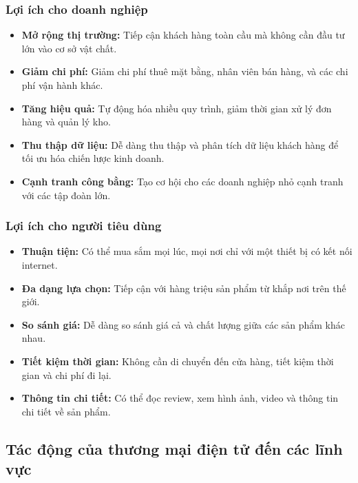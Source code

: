 \documentclass[a4paper,12pt]{report}
\begin{document}
\subsubsection{Lợi ích cho doanh nghiệp}
\begin{itemize}
    \item \textbf{Mở rộng thị trường:} Tiếp cận khách hàng toàn cầu mà không cần đầu tư lớn vào cơ sở vật chất.
    
    \item \textbf{Giảm chi phí:} Giảm chi phí thuê mặt bằng, nhân viên bán hàng, và các chi phí vận hành khác.
    
    \item \textbf{Tăng hiệu quả:} Tự động hóa nhiều quy trình, giảm thời gian xử lý đơn hàng và quản lý kho.
    
    \item \textbf{Thu thập dữ liệu:} Dễ dàng thu thập và phân tích dữ liệu khách hàng để tối ưu hóa chiến lược kinh doanh.
    
    \item \textbf{Cạnh tranh công bằng:} Tạo cơ hội cho các doanh nghiệp nhỏ cạnh tranh với các tập đoàn lớn.
\end{itemize}

\subsubsection{Lợi ích cho người tiêu dùng}
\begin{itemize}
    \item \textbf{Thuận tiện:} Có thể mua sắm mọi lúc, mọi nơi chỉ với một thiết bị có kết nối internet.
    
    \item \textbf{Đa dạng lựa chọn:} Tiếp cận với hàng triệu sản phẩm từ khắp nơi trên thế giới.
    
    \item \textbf{So sánh giá:} Dễ dàng so sánh giá cả và chất lượng giữa các sản phẩm khác nhau.
    
    \item \textbf{Tiết kiệm thời gian:} Không cần di chuyển đến cửa hàng, tiết kiệm thời gian và chi phí đi lại.
    
    \item \textbf{Thông tin chi tiết:} Có thể đọc review, xem hình ảnh, video và thông tin chi tiết về sản phẩm.
\end{itemize}

\subsection{Tác động của thương mại điện tử đến các lĩnh vực}
\end{document}
